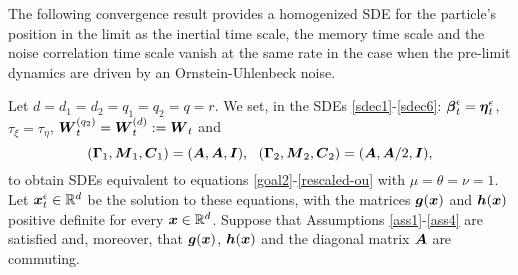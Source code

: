 



The following convergence result provides a homogenized SDE for the particle's position in the limit as the inertial time scale, the memory time scale and the noise correlation time scale vanish at the same rate in the case when the pre-limit dynamics are driven by an Ornstein-Uhlenbeck noise.  

\begin{corollary} \label{model3} 
Let $d=d_1=d_2=q_1=q_2=q=r$. We set, in the SDEs \eqref{sdec1}-\eqref{sdec6}:  $\boldsymbol{\beta}^\epsilon_t = \boldsymbol{\eta}^\epsilon_t$, $\tau_{\xi} = \tau_{\eta}$, $\boldsymbol{W}_t^{(q_2)} = \boldsymbol{W}^{(d)}_t := \boldsymbol{W}_t$ and
\begin{equation}
(\vecc{\Gamma}_1, \vecc{M}_1, \vecc{C}_1) = (\vecc{A}, \vecc{A}, \vecc{I}), \ \  (\vecc{\Gamma}_2, \vecc{M}_2, \vecc{C}_2) = (\vecc{A}, \vecc{A}/2, \vecc{I}),\end{equation}
to obtain  SDEs equivalent to equations \eqref{goal2}-\eqref{rescaled-ou} with $\mu = \theta = \nu = 1$. Let $\boldsymbol{x}^\epsilon_{t} \in \mathbb{R}^{d}$ be the solution to these equations, with the matrices $\boldsymbol{g}(\boldsymbol{x})$ and $\boldsymbol{h}(\boldsymbol{x})$ positive definite for every $\boldsymbol{x} \in \mathbb{R}^d$. Suppose that Assumptions \ref{ass1}-\ref{ass4} are satisfied and, moreover, that  $\boldsymbol{g}(\boldsymbol{x})$, $\boldsymbol{h}(\boldsymbol{x})$  and the diagonal matrix $\boldsymbol{A}$ are commuting.  


\end{corollary}
